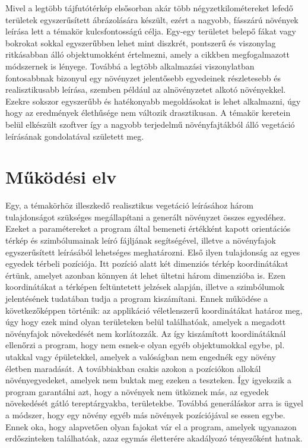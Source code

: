 Mivel a legtöbb tájfutótérkép elsősorban akár több négyzetkilométereket lefedő területek egyszerűsített ábrázolására készült, ezért a nagyobb, fásszárú növények leírása lett a témakör kulcsfontosságú célja. Egy-egy területet belepő fákat vagy bokrokat sokkal egyszerűbben lehet mint diszkrét, pontszerű és viszonylag ritkásabban álló objektumokként értelmezni, amely a \cite{Gasch2022} cikkben megfogalmazott módszernek is lényege. Továbbá a legtöbb alkalmazási viszonylatban fontosabbnak bizonyul egy növényzet jelentősebb egyedeinek részletesebb és realisztikusabb leírása, szemben például az alnövényzetet alkotó növényekkel. Ezekre sokszor egyszerűbb és hatékonyabb megoldásokat is lehet alkalmazni, úgy hogy az eredmények élethűsége nem változik drasztikusan.  A témakör keretein belül elkészült szoftver így a nagyobb terjedelmű növényfajtákból álló vegetáció leírásának gondolatával született meg.\newline

\section{Működési elv}
Egy, a témakörhöz illeszkedő realisztikus vegetáció leírásához három tulajdonságot szükséges megállapítani a generált növényzet összes egyedéhez. Ezeket a paramétereket a program által bemeneti értékként kapott orientációs térkép és szimbólumainak leíró fájljának segítségével, illetve a növényfajok egyszerűsített leírásából lehetséges meghatározni. \newline
Első ilyen tulajdonság az egyes egyedek térbeli pozíciója. Itt pozíció alatt két dimenziós térkép koordinátákat értünk, amelyet azonban könnyen át lehet ültetni három dimenzióba is. Ezen koordinátákat a térképen feltüntetett jelzések alapján, illetve a szimbólumok jelentésének tudatában tudja a program kiszámítani. 
Ennek működése a következőképpen történik: az applikáció véletlenszerű koordinátákat határoz meg, úgy hogy ezek mind olyan területeken belül találhatóak, amelyek a  megadott növényfajok növekedését nem korlátozzák. Az így kiszámított koordinátáknál ellenőrzi a program, hogy nem esnek-e olyan egyéb objektumokkal egybe, pl. utakkal vagy épületekkel, amelyek a valóságban nem engednék egy növény életben maradását. A továbbiakban csakis azokon a pozíciókon allokál növényegyedeket, amelyek nem buktak meg ezeken a teszteken. Így igyekszik a program garantálni azt, hogy a növények nem ütköznek más, az egyedek növekedését gátló tereptárgyakba, területekbe. Továbbá generáláskor arra is ügyel a módszer, hogy egy növény egyéb más növények pozíciójával se essen egybe. Ennek oka, hogy alapvetően olyan fajokat vár el a program, amelyek ugyanazon erdőszinteken találhatóak, azaz egymás életterére akadályozó tényezőként hatnak. 
\newline

